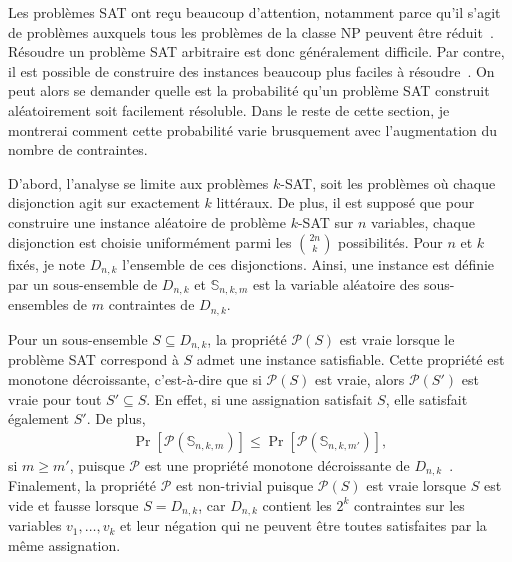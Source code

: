 Les problèmes SAT ont reçu beaucoup d’attention,
notamment parce qu’il s’agit de problèmes auxquels tous les problèmes de la classe NP
peuvent être réduit~\cite{cook_complexity_1971}.
Résoudre un problème SAT arbitraire est donc généralement difficile.
Par contre, il est possible de construire des instances beaucoup
plus faciles à résoudre~\cite{cheeseman_where_1991}.
On peut alors se demander quelle est la probabilité qu’un problème SAT construit
aléatoirement soit facilement résoluble.
Dans le reste de cette section, je montrerai comment cette probabilité varie brusquement
avec l’augmentation du nombre de contraintes.

D'abord,
l'analyse se limite aux problèmes $k$-SAT,
soit les problèmes où chaque disjonction agit sur exactement $k$ littéraux.
De plus,
il est supposé que pour construire une instance aléatoire de problème $k$-SAT sur $n$ variables,
chaque disjonction est choisie uniformément parmi les $\binom{2n}{k}$ possibilités.
Pour $n$ et $k$ fixés, je note $D_{n,k}$ l'ensemble de ces disjonctions.
Ainsi, une instance est définie par un sous-ensemble de $D_{n, k}$ et $\mathbb S_{n,k,m}$ 
est la variable aléatoire des sous-ensembles de $m$ contraintes de $D_{n, k}$.

Pour un sous-ensemble $S \subseteq D_{n, k}$,
la propriété $\mathcal P(S)$ est vraie lorsque le problème SAT correspond à $S$
admet une instance satisfiable.
Cette propriété est monotone décroissante,
c'est-à-dire que si $\mathcal P(S)$ est vraie,
alors $\mathcal P(S')$ est vraie pour tout $S' \subseteq S$.
En effet,
si une assignation satisfait $S$, elle satisfait également $S'$.
De plus,
\begin{align}
  \Pr[\mathcal P(\mathbb S_{n, k, m})] \leq 
  \Pr[\mathcal P(\mathbb S_{n, k, m'})],
\end{align}
si $m \geq m'$,
puisque $\mathcal P$ est une propriété monotone décroissante 
de $D_{n, k}$~\cite{bollobas_threshold_1987}.
Finalement, la propriété $\mathcal P$ est non-trivial puisque
$\mathcal P(S)$ est vraie lorsque $S$ est vide et fausse lorsque $S = D_{n, k}$,
car $D_{n, k}$ contient les $2^k$ contraintes
sur les variables $v_1, \ldots, v_k$ et leur négation
qui ne peuvent être toutes satisfaites par la même assignation.

